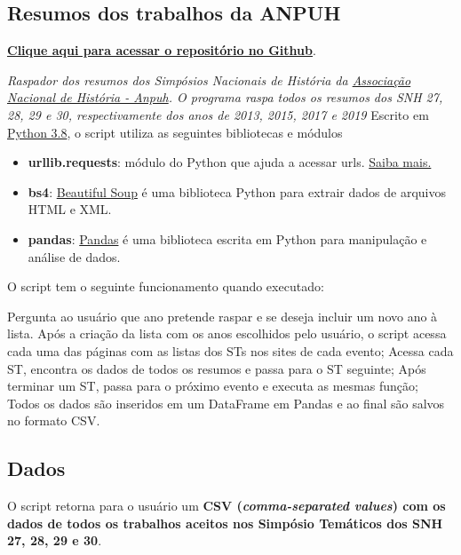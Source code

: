 \documentclass[
]{book}
\providecommand{\tightlist}{%
  \setlength{\itemsep}{0pt}\setlength{\parskip}{0pt}}
\begin{document}
\hypertarget{resumos-dos-trabalhos-da-anpuh}{%
\subsection{Resumos dos trabalhos da ANPUH}\label{resumos-dos-trabalhos-da-anpuh}}

\href{https://github.com/LABHDUFBA/anpuh-scraper}{\textbf{Clique aqui para acessar o repositório no Github}}.

\emph{Raspador dos resumos dos Simpósios Nacionais de História da \href{https://anpuh.org.br}{Associação Nacional de História - Anpuh}. O programa raspa todos os resumos dos SNH 27, 28, 29 e 30, respectivamente dos anos de 2013, 2015, 2017 e 2019}
Escrito em \href{https://www.python.org/}{Python 3.8}, o script utiliza as seguintes bibliotecas e módulos

\begin{itemize}
\tightlist
\item
  \textbf{urllib.requests}: módulo do Python que ajuda a acessar urls.
  \href{https://docs.python.org/pt-br/3/library/urllib.request.htmll}{Saiba mais.}
\item
  \textbf{bs4}: \href{https://www.crummy.com/software/BeautifulSoup/bs4/doc/}{Beautiful Soup} é uma biblioteca Python para extrair dados de arquivos HTML e XML.
\item
  \textbf{pandas}: \href{https://pandas.pydata.org/}{Pandas} é uma biblioteca escrita em Python para manipulação e análise de dados.
\end{itemize}

O script tem o seguinte funcionamento quando executado:

Pergunta ao usuário que ano pretende raspar e se deseja incluir um novo ano à lista.
Após a criação da lista com os anos escolhidos pelo usuário, o script acessa cada uma das páginas com as listas dos STs nos sites de cada evento;
Acessa cada ST, encontra os dados de todos os resumos e passa para o ST seguinte;
Após terminar um ST, passa para o próximo evento e executa as mesmas função;
Todos os dados são inseridos em um DataFrame em Pandas e ao final são salvos no formato CSV.

\hypertarget{dados-1}{%
\subsection{Dados}\label{dados-1}}

O script retorna para o usuário um \textbf{CSV (\emph{comma-separated values}) com os dados de todos os trabalhos aceitos nos Simpósio Temáticos dos SNH 27, 28, 29 e 30}.
\end{document}
